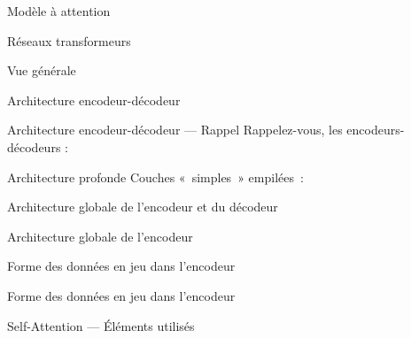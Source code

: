 \begin{frame}{Modèle à attention}
  \begin{center}
  \end{center}
\end{frame}

\begin{frame}{Réseaux transformeurs}
\end{frame}

\begin{frame}{Vue générale}
\end{frame}

\begin{frame}{Architecture encodeur-décodeur}
\end{frame}

\begin{frame}{Architecture encodeur-décodeur --- Rappel}
  Rappelez-vous, les encodeurs-décodeurs :
\end{frame}

\begin{frame}{Architecture profonde}
  Couches «~simples~» empilées~:
\end{frame}

\begin{frame}{Architecture globale de l'encodeur et du décodeur}
\end{frame}

\begin{frame}{Architecture globale de l'encodeur}
\end{frame}

\begin{frame}{Forme des données en jeu dans l'encodeur}
\end{frame}

\begin{frame}{Forme des données en jeu dans l'encodeur}
\end{frame}

\begin{frame}{Self-Attention --- Éléments utilisés}
\end{frame}

